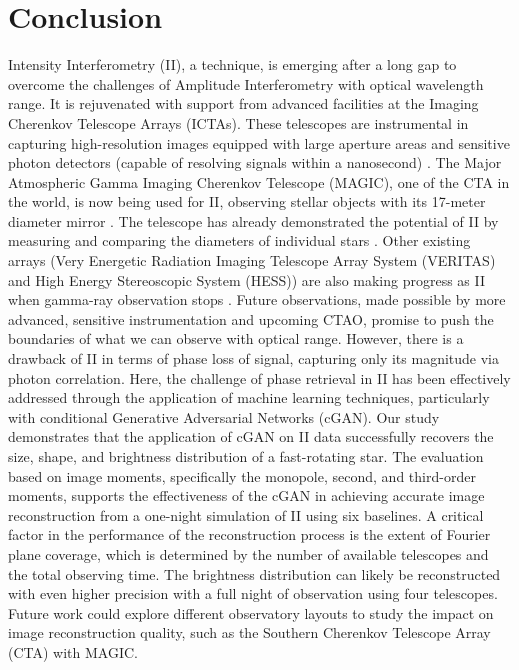 \section{Conclusion}
Intensity Interferometry (II), a technique, is emerging after a long gap to overcome the challenges of Amplitude Interferometry with optical wavelength range. It is rejuvenated with support from advanced facilities at the Imaging Cherenkov Telescope Arrays (ICTAs). These telescopes are instrumental in capturing high-resolution images equipped with large aperture areas and sensitive photon detectors (capable of resolving signals within a nanosecond) \cite{dravins2013optical}. The Major Atmospheric Gamma Imaging Cherenkov Telescope (MAGIC), one of the CTA in the world, is now being used for II, observing stellar objects with its 17-meter diameter mirror \cite{lorenz2004status}. The telescope has already demonstrated the potential of II by measuring and comparing the diameters of individual stars \cite{abe2024performance}. Other existing arrays (Very Energetic Radiation Imaging Telescope Array System (VERITAS) and High Energy Stereoscopic System (HESS)) are also making progress as II when gamma-ray observation stops \cite{kieda2021veritas, zmija2022optical}. Future observations, made possible by more advanced, sensitive instrumentation and upcoming CTAO, promise to push the boundaries of what we can observe with optical range. However, there is a drawback of II in terms of phase loss of signal, capturing only its magnitude via photon correlation. Here, the challenge of phase retrieval in II has been effectively addressed through the application of machine learning techniques, particularly with conditional Generative Adversarial Networks (cGAN). Our study demonstrates that the application of cGAN on II data successfully recovers the size, shape, and brightness distribution of a fast-rotating star. The evaluation based on image moments, specifically the monopole, second, and third-order moments, supports the effectiveness of the cGAN in achieving accurate image reconstruction from a one-night simulation of II using six baselines. A critical factor in the performance of the reconstruction process is the extent of Fourier plane coverage, which is determined by the number of available telescopes and the total observing time. The brightness distribution can likely be reconstructed with even higher precision with a full night of observation using four telescopes. Future work could explore different observatory layouts to study the impact on image reconstruction quality, such as the Southern Cherenkov Telescope Array (CTA) with MAGIC.

